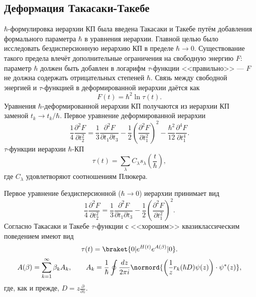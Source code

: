 \documentclass[a4paper,14pt]{extarticle}
\numberwithin{equation}{section}
\begin{document}
\subsection{Деформация Такасаки-Такебе}
$\hbar $-формулировка иерархии КП была введена Такасаки и Такебе 
путём добавления формального параметра $\hbar $ в уравнения
иерархии. Главной целью было исследовать 
бездисперсионную иерархию КП в пределе  $\hbar \to 0$.
Существование такого предела влечёт дополнительные
ограничения на свободную энергию $F$: параметр $\hbar $ 
должен быть добавлен в логарифм $\tau$-функции
<<правильно>> --- $F$ не должна содержать отрицательных степеней $\hbar $. Связь между свободной энергией и $\tau$-функцией
в деформированной иерархии даётся как
\[
F (t)=\hbar ^2 \ln \tau (t)
.\] 
Уравнения $\hbar $-деформированной иерархии КП получаются  из
иерархии КП заменой  $t_k\to t_k /\hbar $.
Первое уравнение деформированной иерархии
\begin{equation}
	\frac{1}{4} \frac{\partial ^2 F}{\partial t_2^2} =\frac{1}{3} \frac{\partial ^2 F}{\partial t_1 \partial t_3} -\frac{1}{2} \left( \frac{\partial^2 F}{\partial t_1^2} \right) ^2-\frac{\hbar ^2}{12} \frac{\partial^4 F}{
	\partial t_1^4}
.\end{equation} 
$\tau$-функции  иерархии $\hbar $-КП
\begin{equation}
	\tau \left( t \right) =
	\sum_{\lambda}^{} C_\lambda 
	s_\lambda \left( \frac{t}{\hbar } \right) 
	\label{eq:3}
,\end{equation} 
где $C _{\lambda}$ удовлетворяют соотношениям Плюкера.

Первое уравнение бездисперсионной ($\hbar \to 0$) иерархии принимает вид
\[
\frac{1}{4} \frac{\partial ^2 F}{\partial  t_2^2} =
\frac{1}{3} \frac{\partial ^2 F}{\partial t_1 \partial t_3} 
-\frac{1}{2} \left( \frac{\partial ^2 F}{\partial t_1^2}  \right) ^2
.\] 
Согласно Такасаки и Такебе $\tau$-функции с <<хорошим>>
квазиклассическим поведением имеют вид
\[
\tau(t)= \braket{0 | e^{H(t)}e^{A(\beta)} | 0}
.\] 
\begin{equation}
A(\beta)=\sum_{k=1}^{\infty} \beta_k A_k,\qquad A_k= \frac{1}{\hbar }\oint \frac{dz}{2\pi i } \normord{
\left(  \frac{1}{z} r_k(\hbar D)   \psi(z) \right) \cdot \psi^*(z)}
,\end{equation} 
где, как и прежде, $D= z \frac{\partial }{\partial z}$.
\end{document}
